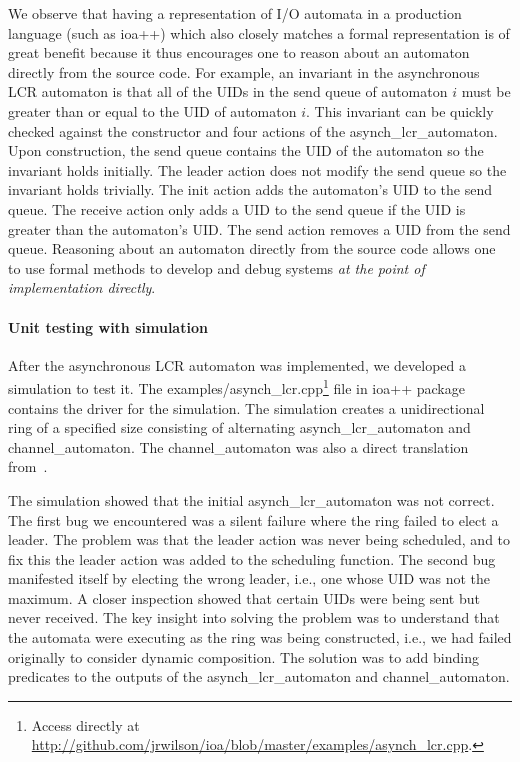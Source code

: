 We observe that having a representation of I/O automata in a production language (such as ioa++) which also closely matches a formal representation is of great benefit because it thus encourages one to reason about an automaton directly from the source code.
For example, an invariant in the asynchronous LCR automaton is that all of the UIDs in the send queue of automaton $i$ must be greater than or equal to the UID of automaton $i$.
This invariant can be quickly checked against the constructor and four actions of the asynch\_lcr\_automaton.
Upon construction, the send queue contains the UID of the automaton so the invariant holds initially.
The leader action does not modify the send queue so the invariant holds trivially.
The init action adds the automaton's UID to the send queue.
The receive action only adds a UID to the send queue if the UID is greater than the automaton's UID.
The send action removes a UID from the send queue.
Reasoning about an automaton directly from the source code allows one to use formal methods to develop and debug systems \emph{at the point of implementation directly}.

\paragraph*{Unit testing with simulation}
After the asynchronous LCR automaton was implemented, we developed a simulation to test it.
The examples/asynch\_lcr.cpp\footnote{Access directly at \url{http://github.com/jrwilson/ioa/blob/master/examples/asynch_lcr.cpp}.} file in ioa++ package contains the driver for the simulation.
The simulation creates a unidirectional ring of a specified size consisting of alternating asynch\_lcr\_automaton and channel\_automaton.
The channel\_automaton was also a direct translation from~\cite{lynch1996distributed}.

The simulation showed that the initial asynch\_lcr\_automaton was not correct.
The first bug we encountered was a silent failure where the ring failed to elect a leader.
The problem was that the leader action was never being scheduled, and to fix this the leader action was added to the scheduling function.
The second bug manifested itself by electing the wrong leader, i.e., one whose UID was not the maximum.
A closer inspection showed that certain UIDs were being sent but never received.
The key insight into solving the problem was to understand that the automata were executing as the ring was being constructed, i.e., we had failed originally to consider dynamic composition.
The solution was to add binding predicates to the outputs of the asynch\_lcr\_automaton and channel\_automaton.

